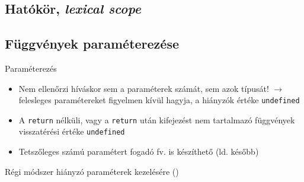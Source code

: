 \subsection{Hatókör, \emph{lexical scope}}

\begin{frame}
    \begin{exampleblock}{}
        \scriptsize
        
    \end{exampleblock}
\end{frame}

\subsection{Függvények paraméterezése}

\begin{frame}
    Paraméterezés
    \begin{itemize}
        \item Nem ellenőrzi híváskor sem a paraméterek számát, sem azok típusát! $\to$ felesleges paramétereket figyelmen kívül hagyja, a hiányzók értéke \texttt{undefined}
        \item A \texttt{return} nélküli, vagy a \texttt{return} után kifejezést nem tartalmazó függvények visszatérési értéke \texttt{undefined}
        \item Tetszőleges számú paramétert fogadó fv. is készíthető (ld. később)
    \end{itemize}
    \begin{exampleblock}{}
        \small
        \vspace{-0.3cm}
        
        \vspace{-0.3cm}
    \end{exampleblock}
\end{frame}

\begin{frame}
    \begin{exampleblock}{}
        
    \end{exampleblock}
\end{frame}

\begin{frame}
    \begin{exampleblock}{Régi módszer hiányzó paraméterek kezelésére ()}
        \small
        
    \end{exampleblock}
\end{frame}

